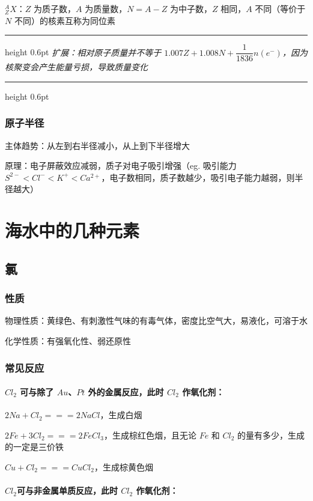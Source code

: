 \documentclass[UTF8,zihao=-4,openany]{ctexbook}
\newenvironment{notebox}
  {\par\smallskip\noindent\begingroup\begin{minipage}{\linewidth}\color{noteframe}\hrule height 0.6pt\smallskip\color{black}\itshape}
  {\par\smallskip\color{noteframe}\hrule height 0.6pt\end{minipage}\endgroup\par\smallskip}
\begin{document}
$^A_ZX$：$Z$ 为质子数，$A$ 为质量数，$N=A-Z$ 为中子数，$Z$ 相同，$A$ 不同（等价于 $N$ 不同）的核素互称为同位素\par
\begin{notebox}
扩展：相对原子质量并不等于 $1.007Z+1.008N+\dfrac{1}{1836}n(e^-)$，因为核聚变会产生能量亏损，导致质量变化\par
\end{notebox}
\subsection{原子半径}
主体趋势：从左到右半径减小，从上到下半径增大\par

原理：电子屏蔽效应减弱，质子对电子吸引增强（eg. 吸引能力 $S^{2-}<Cl^-<K^+<Ca^{2+}$，电子数相同，质子数越少，吸引电子能力越弱，则半径越大）\par
\chapter{海水中的几种元素}
\section{氯}
\subsection{性质}
物理性质：黄绿色、有刺激性气味的有毒气体，密度比空气大，易液化，可溶于水\par

化学性质：有强氧化性、弱还原性\par
\subsection{常见反应}
\subsubsection{$Cl_2$ 可与除了 $Au$、$Pt$ 外的金属反应，此时 $Cl_2$ 作氧化剂：}

$2Na+Cl_2=\!=\!=2NaCl$，生成白烟\par

$2Fe+3Cl_2=\!=\!=2FeCl_3$，生成棕红色烟，且无论 $Fe$ 和 $Cl_2$ 的量有多少，生成的一定是三价铁\par

$Cu+Cl_2=\!=\!=CuCl_2$，生成棕黄色烟\par
\subsubsection{$Cl_2$可与非金属单质反应，此时 $Cl_2$ 作氧化剂：}
\end{document}
